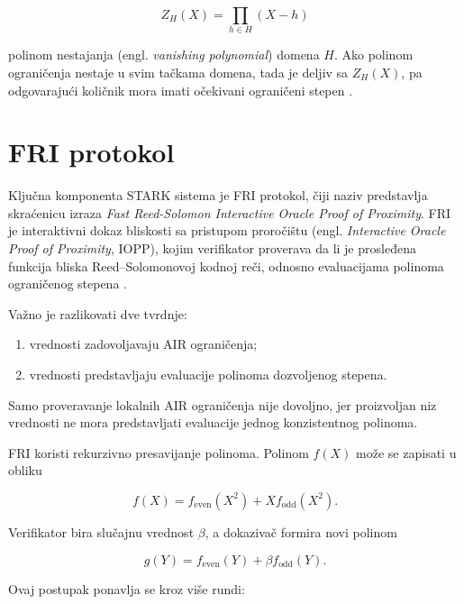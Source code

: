 \begin{equation}
    Z_H(X) = \prod_{h \in H}\left(X-h\right)
\end{equation}

polinom nestajanja (engl. \textit{vanishing polynomial}) domena \(H\). Ako
polinom ograničenja nestaje u svim tačkama domena, tada je deljiv sa \(Z_H(X)\),
pa odgovarajući količnik mora imati očekivani ograničeni stepen
\cite{stark2018,ethstark2023}.

\section{FRI protokol}

Ključna komponenta STARK sistema je FRI protokol, čiji naziv predstavlja
skraćenicu izraza
\textit{Fast Reed-Solomon Interactive Oracle Proof of Proximity}. FRI je
interaktivni dokaz bliskosti sa pristupom proročištu
(engl. \textit{Interactive Oracle Proof of Proximity}, IOPP), kojim verifikator
proverava da li je prosleđena funkcija bliska Reed--Solomonovoj kodnoj reči,
odnosno evaluacijama polinoma ograničenog stepena
\cite{stark2018,ethstark2023,deepfri2020}.

Važno je razlikovati dve tvrdnje:

\begin{enumerate}
    \item vrednosti zadovoljavaju AIR ograničenja;
    \item vrednosti predstavljaju evaluacije polinoma dozvoljenog stepena.
\end{enumerate}

Samo proveravanje lokalnih AIR ograničenja nije dovoljno, jer proizvoljan niz
vrednosti ne mora predstavljati evaluacije jednog konzistentnog polinoma.

FRI koristi rekurzivno presavijanje polinoma. Polinom \(f(X)\) može se zapisati
u obliku

\begin{equation}
    f(X) = f_{\mathrm{even}}\left(X^2\right)
    + Xf_{\mathrm{odd}}\left(X^2\right).
\end{equation}

Verifikator bira slučajnu vrednost \(\beta\), a dokazivač formira novi polinom

\begin{equation}
    g(Y) = f_{\mathrm{even}}(Y)+\beta f_{\mathrm{odd}}(Y).
\end{equation}

Ovaj postupak ponavlja se kroz više rundi:

